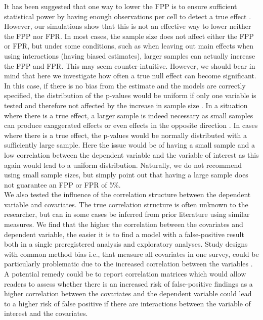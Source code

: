 It has been suggested that one way to lower the FPP is to ensure sufficient statistical power by having enough observations per cell to detect a true effect \citep{Simmons2011, simmons2018}. However, our simulations show that this is not an effective way to lower neither the FPP nor FPR. In most cases, the sample size does not affect either the FPP or FPR, but under some conditions, such as when leaving out main effects when using interactions (having biased estimates), larger samples can actually increase the FPP and FPR. This may seem counter-intuitive. However, we should bear in mind that here we investigate how often a true null effect can become significant. In this case, if there is no bias from the estimate and the models are correctly specified, the distribution of the p-values would be uniform if only one variable is tested and therefore not affected by the increase in sample size \citep{Murdoch2008}. In a situation where there is a true effect, a larger sample is indeed necessary as small samples can produce exaggerated effects or even effects in the opposite direction \citep{gelman2014beyond}. In cases where there is a true effect, the p-values would be normally distributed with a sufficiently large sample. Here the issue would be of having a small sample and a low correlation between the dependent variable and the variable of interest as this again would lead to a uniform distribution. Naturally, we do not recommend using small sample sizes, but simply point out that having a large sample does not guarantee an FPP or FPR of 5\%. \\

We also tested the influence of the correlation structure between the dependent variable and covariates. The true correlation structure is often unknown to the researcher, but can in some cases be inferred from prior literature using similar measures. We find that the higher the correlation between the covariates and dependent variable, the easier it is to find a model with a false-positive result both in a single preregistered analysis and exploratory analyses. Study designs with common method bias i.e., that measure all covariates in one survey, could be particularly problematic due to the increased correlation between the variables \citep{podsakoff2003}. A potential remedy could be to report correlation matrices which would allow readers to assess whether there is an increased risk of false-positive findings as a higher correlation between the covariates and the dependent variable could lead to a higher risk of false positive if there are interactions between the variable of interest and the covariates.  \\ 

